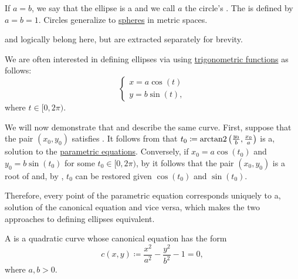 \begin{definition}
\begin{thmenum}
    If \( a = b \), we say that the ellipse is a  and we call \( a \) the circle's . The  is defined by \( a = b = 1 \). Circles generalize to \hyperref[def:metric_space/sphere]{spheres} in metric spaces.

     and  logically belong here, but are extracted separately for brevity.

    We are often interested in defining ellipses via  using \hyperref[def:trigonometric_functions]{trigonometric functions} as follows:
    \begin{equation}\label{def:quadratic_plane_curve/ellipse/parametric_equations}
      \begin{cases}
        x = a \cos(t) \\
        y = b \sin(t),
      \end{cases}
    \end{equation}
    where \( t \in [0, 2\pi) \).

    We will now demonstrate that  and  describe the same curve. First, suppose that the pair \( (x_0, y_0) \) satisfies . It follows from  that \( t_0 \coloneqq \operatorname{arctan2}\left(\tfrac {y_0} b, \tfrac {x_0} a \right) \) is a, solution to the \hyperref[def:quadratic_plane_curve/ellipse/parametric_equations]{parametric equations}. Conversely, if \( x_0 = a \cos(t_0) \) and \( y_0 = b \sin(t_0) \) for some \( t_0 \in [0, 2\pi) \), by  it follows that the pair \( (x_0, y_0) \) is a root of  and, by , \( t_0 \) can be restored given \( \cos(t_0) \) and \( \sin(t_0) \).

    Therefore, every point of the parametric equation  corresponds uniquely to a, solution of the canonical equation  and vice versa, which makes the two approaches to defining ellipses equivalent.

     A  is a quadratic curve whose canonical equation has the form
    \begin{equation}\label{def:quadratic_plane_curve/hyperbola/canonical_equation}
      c(x, y) \coloneqq \frac {x^2} {a^2} - \frac {y^2} {b^2} - 1 = 0,
    \end{equation}
    where \( a, b > 0 \).


\end{thmenum}
\end{definition}
